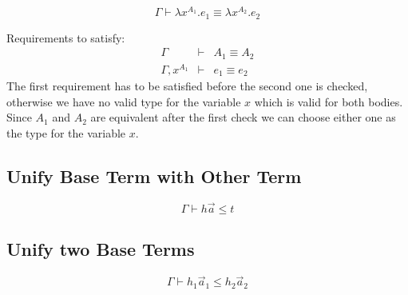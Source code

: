 $$
    \Gamma \vdash \lambda x^{A_1}. e_1 \equiv \lambda x^{A_2}. e_2
$$

Requirements to satisfy:
$$
\begin{array}{lll}
    \Gamma &\vdash&
    A_1 \equiv A_2
    \\
    \Gamma, x^{A_1} &\vdash&
    e_1 \equiv e_2
\end{array}
$$
The first requirement has to be satisfied before the second one is checked,
otherwise we have no valid type for the variable $x$ which is valid for both
bodies. Since $A_1$ and $A_2$ are equivalent after the first check we can choose
either one as the type for the variable $x$.






\subsection{Unify Base Term with Other Term}


$$
    \Gamma \vdash h \vec a \le t
$$




\subsection{Unify two Base Terms}


$$
    \Gamma \vdash h_1 \vec a_1 \le h_2 \vec a_2
$$
